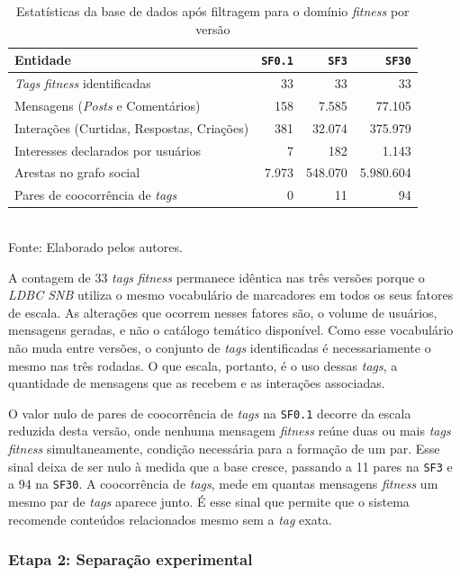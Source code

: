 \documentclass[a4paper,12pt]{article}
\begin{document}
{\begin{table}[H]
\centering
\caption{Estatísticas da base de dados após filtragem para o domínio \textit{fitness} por versão}
\label{tab:estatisticas_extracao}
\small
\begin{tabular}{|l|r|r|r|}
\hline
\textbf{Entidade} & \textbf{\texttt{SF0.1}} & \textbf{\texttt{SF3}} & \textbf{\texttt{SF30}} \\
\hline
\textit{Tags} \textit{fitness} identificadas & 33 & 33 & 33 \\
Mensagens (\textit{Posts} e Comentários) & 158 & 7.585 & 77.105 \\
Interações (Curtidas, Respostas, Criações) & 381 & 32.074 & 375.979 \\
Interesses declarados por usuários & 7 & 182 & 1.143 \\
Arestas no grafo social & 7.973 & 548.070 & 5.980.604 \\
Pares de coocorrência de \textit{tags} & 0 & 11 & 94 \\
\hline
\end{tabular}
\small \\ Fonte: Elaborado pelos autores.
\end{table}


A contagem de 33 \textit{tags} \textit{fitness} permanece idêntica nas três versões porque o \textit{LDBC SNB} utiliza o mesmo vocabulário de marcadores em todos os seus fatores de escala. As alterações que ocorrem nesses fatores são, o volume de usuários, mensagens geradas, e não o catálogo temático disponível. Como esse vocabulário não muda entre versões, o conjunto de \textit{tags} identificadas é necessariamente o mesmo nas três rodadas. O que escala, portanto, é o uso dessas \textit{tags}, a quantidade de mensagens que as recebem e as interações associadas.

O valor nulo de pares de coocorrência de \textit{tags} na \texttt{SF0.1} decorre da escala reduzida desta versão, onde nenhuma mensagem \textit{fitness} reúne duas ou mais \textit{tags} \textit{fitness} simultaneamente, condição necessária para a formação de um par. Esse sinal deixa de ser nulo à medida que a base cresce, passando a 11 pares na \texttt{SF3} e a 94 na \texttt{SF30}. A coocorrência de \textit{tags}, mede em quantas mensagens \textit{fitness} um mesmo par de \textit{tags} aparece junto. É esse sinal que permite que o sistema recomende conteúdos relacionados mesmo sem a \textit{tag} exata.


\subsubsection{Etapa 2: Separação experimental}

}
\end{document}
